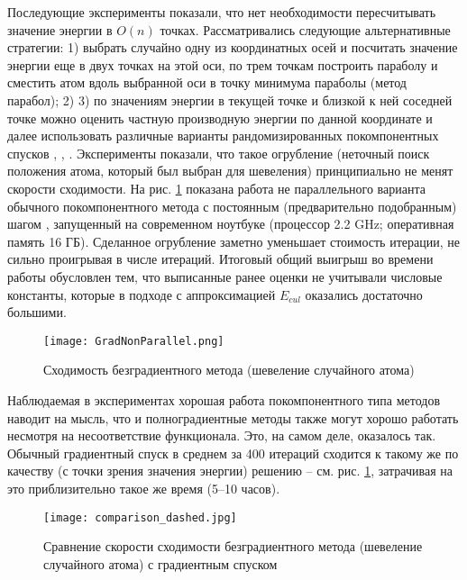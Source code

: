   Последующие эксперименты показали, что нет необходимости пересчитывать значение энергии в ${O}\left( n \right)$ точках. Рассматривались следующие альтернативные стратегии: 1) выбрать случайно одну из координатных осей и посчитать значение энергии еще в двух точках на этой оси, по трем точкам построить параболу и сместить атом вдоль выбранной оси в точку минимума параболы (метод парабол); 2)  3) по значениям энергии в текущей точке и близкой к ней соседней точке можно оценить частную производную энергии по данной координате и далее использовать различные варианты рандомизированных покомпонентных спусков 
  \cite{conn2009introduction},
  \cite{ghadimi2013stochastic}, \cite{wright2015coordinate}.
  Эксперименты показали, что такое огрубление (неточный поиск положения атома, который был выбран для шевеления) принципиально не менят скорости сходимости. На рис. \ref{GF} показана работа не параллельного варианта обычного покомпонентного метода с постоянным (предварительно подобранным) шагом \cite{ghadimi2013stochastic}, запущенный на современном ноутбуке (процессор 2.2 GHz; оперативная память 16 ГБ). Сделанное огрубление заметно уменьшает стоимость итерации, не сильно проигрывая в числе итераций. Итоговый общий выигрыш во времени работы обусловлен тем, что выписанные ранее оценки не учитывали числовые константы, которые в подходе с аппроксимацией $E_{cul}$ оказались достаточно большими. 

  \begin{figure}
  \begin{center}
  \texttt{[image: GradNonParallel.png]}
  \end{center}
  \caption{Сходимость безградиентного метода (шевеление случайного атома)}
   \label{GF}
  \end{figure}

  Наблюдаемая в экспериментах хорошая работа покомпонентного типа методов наводит на мысль, что и полноградиентные методы также могут хорошо работать несмотря на несоответствие функционала. Это, на самом деле, оказалось так. Обычный градиентный спуск в среднем за 400 итераций сходится к такому же по качеству (с точки зрения значения энергии) решению -- см. рис. \ref{GF}, затрачивая на это приблизительно такое же время (5--10 часов). 


  \begin{figure}
  \begin{center}
  \texttt{[image: comparison\_dashed.jpg]}
  \end{center}
  \caption{Сравнение скорости сходимости безградиентного метода (шевеление случайного атома) с градиентным спуском}
   \label{Compare}
  \end{figure}

